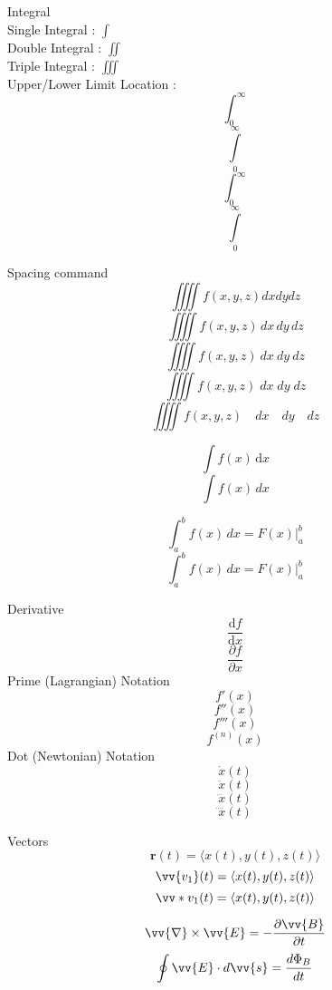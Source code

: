 \documentclass{article}
\begin{document}
    \newpage


    {\Large Integral } \\[5pt]
    {\normalsize Single Integral : } \( \int \)\\
    {\normalsize Double Integral : } \( \iint \)\\
    {\normalsize Triple Integral : } \( \iiint  \)\\
    {\normalsize Upper/Lower Limit Location : }\\
    \[ \textstyle \int_0^\infty \]
    \[ \textstyle \int \limits_0^\infty \]
    \[ \displaystyle \int_0^\infty \]
    \[ \displaystyle \int \limits_0^\infty \]

    {\Large Spacing command}
    \[ \iiiint f(x,y,z) dx dy dz \]
    \[ \iiiint f(x,y,z) \, dx \, dy \, dz \]
    \[ \iiiint f(x,y,z) \: dx \: dy \: dz \]
    \[ \iiiint f(x,y,z) \; dx \; dy \; dz \]
    \[ \iiiint f(x,y,z) \quad dx \quad dy \quad dz \]

    \[ \int f(x) \, \mathrm{d}x \]
    \[ \int f(x) \, dx \]

    \[ \displaystyle \int_a^b f(x) \, dx = F(x) \bigg\vert_a^b \]
    \[ \textstyle \int_a^b f(x) \, dx = F(x) \bigg\vert_a^b \]


    \newpage


    {\Large Derivative}\\
    \[ \frac{ \mathrm{d}f }{ \mathrm{d}x } \]
    \[ \frac{\partial f}{\partial x} \]
    {\normalsize Prime (Lagrangian) Notation}
    \[ f'(x) \]
    \[ f''(x) \]
    \[ f'''(x) \]
    \[ f^{(n)}(x) \]
    {\normalsize Dot (Newtonian) Notation}
    \[ \dot{x}(t) \]
    \[ \ddot{x}(t) \]
    \[ \dddot{x}(t) \]
    \[ \ddddot{x}(t) \]

    {\Large Vectors}
    \[ \bm{r}(t) = \langle x(t),y(t),z(t) \rangle \]
    \[ \vv{v_1}(t) = \langle x(t),y(t),z(t) \rangle \]
    \[ \vv*{v_1}(t) = \langle x(t),y(t),z(t) \rangle \]

    \[ \vv{\nabla} \times \vv{E} = - \frac{\partial \vv{B}}{\partial t} \]
    \[ \oint \vv{E} \cdot d\vv{s} = \dfrac{d\Phi_B}{dt} \]
\end{document}
